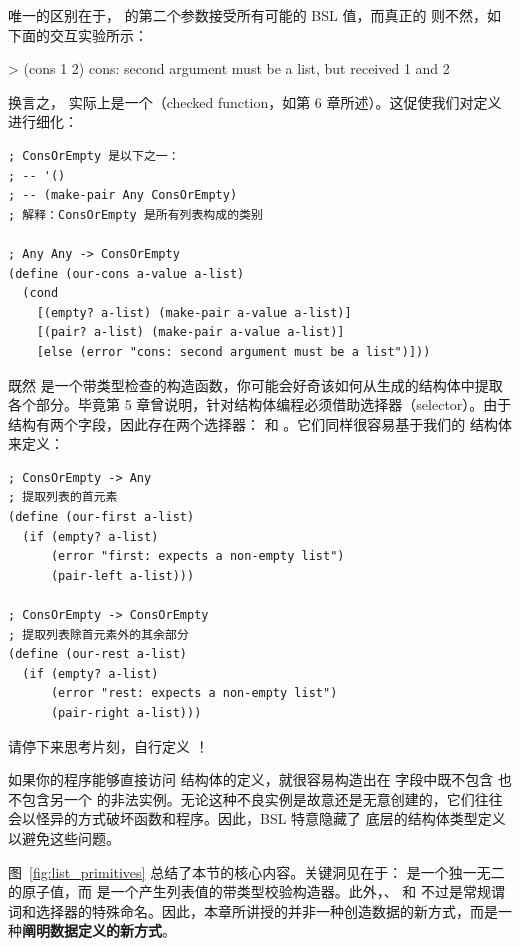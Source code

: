 唯一的区别在于， 的第二个参数接受所有可能的 BSL 值，而真正的  则不然，如下面的交互实验所示：
\begin{replbox}
> (cons 1 2)
cons: second argument must be a list, but received 1 and 2
\end{replbox}

换言之， 实际上是一个（checked function，如第 6 章所述）。这促使我们对定义进行细化：
\begin{lstlisting}[language=BSL]
; ConsOrEmpty 是以下之一：
; -- '()
; -- (make-pair Any ConsOrEmpty)
; 解释：ConsOrEmpty 是所有列表构成的类别

; Any Any -> ConsOrEmpty
(define (our-cons a-value a-list)
  (cond
    [(empty? a-list) (make-pair a-value a-list)]
    [(pair? a-list) (make-pair a-value a-list)]
    [else (error "cons: second argument must be a list")]))
\end{lstlisting}

既然  是一个带类型检查的构造函数，你可能会好奇该如何从生成的结构体中提取各个部分。毕竟第 5 章曾说明，针对结构体编程必须借助选择器（selector）。由于  结构有两个字段，因此存在两个选择器： 和 。它们同样很容易基于我们的  结构体来定义：
\begin{lstlisting}[language=BSL]
; ConsOrEmpty -> Any
; 提取列表的首元素
(define (our-first a-list)
  (if (empty? a-list)
      (error "first: expects a non-empty list")
      (pair-left a-list)))

; ConsOrEmpty -> ConsOrEmpty
; 提取列表除首元素外的其余部分
(define (our-rest a-list)
  (if (empty? a-list)
      (error "rest: expects a non-empty list")
      (pair-right a-list)))
\end{lstlisting}

请停下来思考片刻，自行定义 ！

如果你的程序能够直接访问  结构体的定义，就很容易构造出在  字段中既不包含  也不包含另一个  的非法实例。无论这种不良实例是故意还是无意创建的，它们往往会以怪异的方式破坏函数和程序。因此，BSL 特意隐藏了  底层的结构体类型定义以避免这些问题。

图~\ref{fig:list_primitives} 总结了本节的核心内容。关键洞见在于： 是一个独一无二的原子值，而  是一个产生列表值的带类型校验构造器。此外，、 和  不过是常规谓词和选择器的特殊命名。因此，本章所讲授的并非一种创造数据的新方式，而是一种\textbf{阐明数据定义的新方式}。

